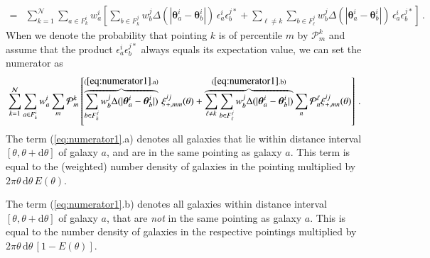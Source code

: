 \documentclass[referee]{aa} %
\renewcommand{\[}{\begin{equation}}
\renewcommand{\]}{\end{equation}}
\renewcommand{\rm}{\mathrm}
\def\b#1{\bm{#1}}
\begin{document}
\begin{appendix}
\begin{align}
  = & \sum_{k=1}^\mathcal{N}\sum_{a\in F_k^i}w_a^i \left[\sum_{b\in F_{k}^j} w_b^j \Delta(|\b\theta_a^i-\b\theta_b^i|)\, \epsilon_a^i\epsilon_b^{j*} + \sum_{\ell\neq k} \sum_{b\in F_{\ell}^j} w_b^j \Delta(|\b\theta_a^i-\b\theta_b^i|)\, \epsilon_a^i\epsilon_b^{j*}\right] \, .
\end{align}
When we denote the probability that pointing $k$ is of percentile $m$ by $\mathcal{P}_m^k$ and assume that the product $\epsilon_a^i\epsilon_b^{j*}$ always equals its expectation value, we can set the numerator as \[
\sum_{k=1}^\mathcal{N}\sum_{a\in F_k^i}w_a^i \sum_m \mathcal{P}_m^k \left[\overbrace{\sum_{b\in F_{k}^j} w_b^j \Delta(|\b\theta_a^i-\b\theta_b^i|)}^{\rm{(\ref{eq:numerator1}.a)}}\,  \xi_{+,mm}^{ij}(\theta) + \overbrace{\sum_{\ell\neq k} \sum_{b\in F_{\ell}^j} w_b^j \Delta(|\b\theta_a^i-\b\theta_b^i|)}^{\rm{(\ref{eq:numerator1}.b)}} \sum_n \mathcal{P}_n^{\ell} \xi_{+,mn}^{ij}(\theta)\right] \, .
\label{eq:numerator1}
\]
The term (\ref{eq:numerator1}.a) denotes all galaxies that lie within distance interval $[\theta,\theta+{\rm d}\theta]$ of galaxy $a$, and are in the same pointing as galaxy $a$. This term is equal to the (weighted) number density of galaxies in the pointing multiplied by $2\pi\theta\, {\rm d}\theta\, E(\theta)$. 

The term (\ref{eq:numerator1}.b) denotes all galaxies within distance interval $[\theta,\theta+{\rm d}\theta]$ of galaxy $a$, that are \textit{not} in the same pointing as galaxy $a$. This is equal to the number density of galaxies in the respective pointings multiplied by $2\pi\theta\, {\rm d}\theta\, [1-E(\theta)]$. 
 

\end{appendix}
\end{document}
